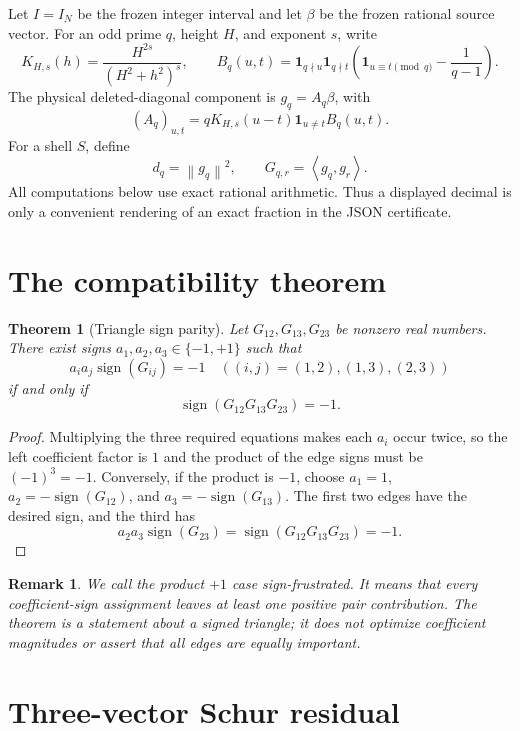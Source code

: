 \documentclass[10pt]{article}
\newtheorem{theorem}{Theorem}
\newtheorem{remark}{Remark}
\newcommand{\norm}[1]{\left\lVert #1\right\rVert}
\newcommand{\ip}[2]{\left\langle #1,#2\right\rangle}
\begin{document}
Let $I=I_N$ be the frozen integer interval and let $\beta$ be the frozen
rational source vector.  For an odd prime $q$, height $H$, and exponent $s$,
write
\[
 K_{H,s}(h)=\frac{H^{2s}}{(H^2+h^2)^s},\qquad
 B_q(u,t)=\mathbf 1_{q\nmid u}\mathbf 1_{q\nmid t}
 \left(\mathbf 1_{u\equiv t\pmod q}-\frac1{q-1}\right).
\]
The physical deleted-diagonal component is $g_q=A_q\beta$, with
\[
 (A_q)_{u,t}=qK_{H,s}(u-t)\mathbf 1_{u\ne t}B_q(u,t).
 \label{eq:model}
\]
For a shell $S$, define
\[
 d_q=\norm{g_q}^2,\qquad G_{q,r}=\ip{g_q}{g_r}.
 \label{eq:gram}
\]
All computations below use exact rational arithmetic.  Thus a displayed
decimal is only a convenient rendering of an exact fraction in the JSON
certificate.

\section{The compatibility theorem}

\begin{theorem}[Triangle sign parity]
Let $G_{12},G_{13},G_{23}$ be nonzero real numbers.  There exist signs
$a_1,a_2,a_3\in\{-1,+1\}$ such that
\[
 a_i a_j\operatorname{sign}(G_{ij})=-1
 \quad ((i,j)=(1,2),(1,3),(2,3))
 \]
if and only if
\[
 \operatorname{sign}(G_{12}G_{13}G_{23})=-1.
\]
\end{theorem}

\begin{proof}
Multiplying the three required equations makes each $a_i$ occur twice, so
the left coefficient factor is $1$ and the product of the edge signs must be
$(-1)^3=-1$.  Conversely, if the product is $-1$, choose
$a_1=1$, $a_2=-\operatorname{sign}(G_{12})$, and
$a_3=-\operatorname{sign}(G_{13})$.  The first two edges have the desired
sign, and the third has
\[
 a_2a_3\operatorname{sign}(G_{23})
 =\operatorname{sign}(G_{12}G_{13}G_{23})=-1.
\]
\end{proof}

\begin{remark}
We call the product $+1$ case \emph{sign-frustrated}.  It means that every
coefficient-sign assignment leaves at least one positive pair contribution.
The theorem is a statement about a signed triangle; it does not optimize
coefficient magnitudes or assert that all edges are equally important.
\end{remark}

\section{Three-vector Schur residual}
\end{document}
